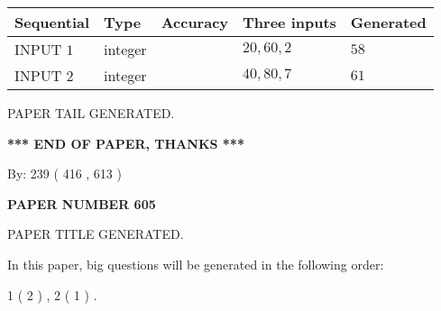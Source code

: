\documentclass{ctexart}
\begin{document}
   
  
  
\noindent\begin{tabular}{|l|l|l|l|l|}
\hline
 Sequential & Type & Accuracy & Three inputs & Generated \\ 
\hline
 
 
  INPUT $  1 $ & integer &  & $
 20
 , 
 60
 , 
 2
 $ & $ 58 $ 
 \\  \hline  
 
 
  INPUT $  2 $ & integer &  & $
 40
 , 
 80
 , 
 7
 $ & $ 61 $ 
 \\  \hline  
 \end{tabular}
   
   
   
   
   
   
 \vspace{0.2in}
 
   
   
\vspace{2.0in} PAPER TAIL GENERATED.
   
   
   
   
\vspace{1.0in} 
{\textbf{\large{ *** END OF PAPER, THANKS *** }}} 
   
   
\hspace{1.0in} By: 
 239 ( 416 ,  613 )
   
   
   
   
\newpage 
\setcounter{page}{ 
   605001 } 
   
   
   
   
 {\textbf{ \Large{ PAPER NUMBER  605  }}}
   
   
\vspace{0.2in}
   
   
   
   
   
   
   
   
 \vspace{0.2in}
 
 
 
 
   
   
 PAPER TITLE GENERATED.
   
   
   
\vspace{0.2in}
   
In this paper, big questions will be generated in the following order: 
   
   
   1 ( 2 )
 ,
   2 ( 1 )
 .
  
\end{document}
